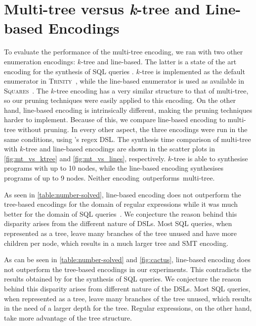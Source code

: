 \section{Multi-tree versus \texorpdfstring{\textit{k}-tree}{k-tree} and Line-based Encodings}\label{sec:multi-tree-vs-encodings}



To evaluate the performance of the multi-tree encoding, we ran \Forest{} with two other enumeration encodings: \(k\)-tree and line-based.
The latter is a state of the art encoding for the synthesis of SQL queries \cite{Orvalho19,DBLP:journals/pvldb/OrvalhoTVMM20}.
\(k\)-tree is implemented as the default enumerator in \textsc{Trinity}~\cite{trinity19}, while the line-based enumerator is used as available in \textsc{Squares}~\cite{squares-webpage}.
The \(k\)-tree encoding has a very similar structure to that of multi-tree, so our pruning techniques were easily applied to this encoding.
On the other hand, line-based encoding is intrinsically different, making the pruning techniques harder to implement. Because of this, we compare line-based encoding to multi-tree without pruning.
In every other aspect, the three encodings were run in the same conditions, using \Forest{}'s regex \ac{DSL}.
The synthesis time comparison of multi-tree with \(k\)-tree and line-based encodings are shown in the scatter plots in \autoref{fig:mt_vs_ktree} and \autoref{fig:mt_vs_lines}, respectively.
\(k\)-tree is able to synthesise programs with up to 10 nodes, while the line-based encoding synthesises programs of up to 9 nodes. Neither encoding~outperforms~multi-tree.

As seen in \autoref{table:number-solved}, line-based encoding does not outperform the tree-based encodings for the domain of regular expressions while it was much better for the domain of SQL queries~\cite{Orvalho19}. We conjecture the reason behind this disparity arises from the different nature of \ac{DSL}s. Most SQL queries, when represented as a tree, leave many branches of the tree unused and have more children per node, which results in a much larger tree and SMT encoding.

As can be seen in \autoref{table:number-solved} and \autoref{fig:cactus}, line-based encoding does not outperform the tree-based encodings in our experiments. This contradicts the results obtained by \citet{Orvalho19} for the synthesis of SQL queries. We conjecture the reason behind this disparity arises from different nature of the DSLs. Most SQL queries, when represented as a tree, leave many branches of the tree unused, which results in the need of a larger depth for the tree. Regular expressions, on the other hand, take more advantage of the tree structure.

